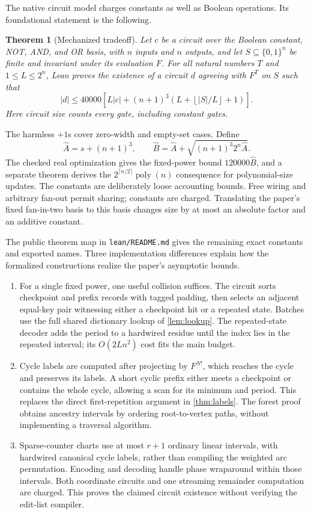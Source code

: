 \documentclass[11pt]{article}
\newtheorem{theorem}{Theorem}[section]
\theoremstyle{definition}
\theoremstyle{remark}
\newcommand{\bits}{\{0,1\}}
\newcommand{\poly}{\operatorname{poly}}
\newcommand{\floor}[1]{\left\lfloor #1\right\rfloor}
\numberwithin{equation}{section}
\begin{document}
The native circuit model charges constants as well as Boolean operations.
Its foundational statement is the following.

\begin{theorem}[Mechanized tradeoff]\label{thm:lean}
Let $c$ be a circuit over the Boolean constant, NOT, AND, and OR basis,
with $n$ inputs and $n$ outputs, and let $S\subseteq\bits^n$ be finite
and invariant under its evaluation $F$.  For all natural numbers $T$ and
$1\leq L\leq2^n$, Lean proves the existence of a circuit $d$ agreeing
with $F^T$ on $S$ such that
\[
 |d|\leq40000\left[L|c|+(n+1)^3
       \left(L+\floor{|S|/L}+1\right)\right].
\]
Here circuit size counts every gate, including constant gates.
\end{theorem}

The harmless $+1$s cover zero-width and empty-set cases.  Define
\[
 \widehat A=s+(n+1)^3,\qquad
 \widehat B=\widehat A+\sqrt{(n+1)^3 2^n\widehat A}.
\]
The checked real optimization gives the fixed-power bound
$120000\widehat B$, and a separate theorem derives the
$2^{\lceil n/2\rceil}\poly(n)$ consequence for polynomial-size updates.
The constants are deliberately loose accounting bounds.  Free wiring
and arbitrary fan-out permit sharing; constants are charged.
Translating the paper's fixed fan-in-two basis to this basis changes
size by at most an absolute factor and an additive constant.

The public theorem map in \texttt{lean/README.md} gives the remaining exact
constants and exported names.  Three implementation differences explain how
the formalized constructions realize the paper's asymptotic bounds.

\begin{enumerate}
\item For a single fixed power, one useful collision suffices.  The circuit
sorts checkpoint and prefix records with tagged padding, then selects an
adjacent equal-key pair witnessing either a checkpoint hit or a repeated
state.  Batches use the full shared dictionary lookup of \cref{lem:lookup}.
The repeated-state decoder adds the period to a hardwired residue until the
index lies in the repeated interval; its $O(2Ln^2)$ cost fits
the main budget.
\item Cycle labels are computed after projecting by $F^{N!}$, which reaches
the cycle and preserves its labels.  A short cyclic prefix either meets a
checkpoint or contains the whole cycle, allowing a scan for its minimum and
period.  This replaces the direct first-repetition argument in
\cref{thm:labels}.  The forest proof obtains ancestry intervals by ordering
root-to-vertex paths, without implementing a traversal algorithm.
\item Sparse-counter charts use at most $r+1$ ordinary linear intervals,
with hardwired canonical cycle labels, rather than compiling the weighted
arc permutation.  Encoding and decoding handle phase wraparound within
those intervals.  Both coordinate circuits and one streaming remainder
computation are charged.  This proves the claimed circuit existence without
verifying the edit-list compiler.
\end{enumerate}
\end{document}
